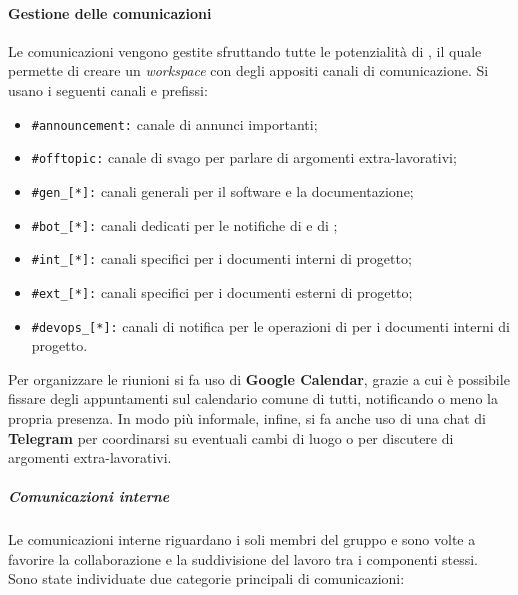 		\paragraph{Gestione delle comunicazioni}

		Le comunicazioni vengono gestite sfruttando tutte le potenzialità di , il quale permette di creare un \textit{workspace} con degli appositi canali di comunicazione. Si usano i seguenti canali e prefissi:
			\begin{itemize}
			  \item \verb!#announcement:! canale di annunci importanti;
			  \item \verb!#offtopic:! canale di svago per parlare di argomenti extra-lavorativi;
			  \item \verb!#gen_[*]:! canali generali per il software e la documentazione;
			  \item \verb!#bot_[*]:! canali dedicati per le notifiche di  e di ;
			  \item \verb!#int_[*]:! canali specifici per i documenti interni di progetto;
			  \item \verb!#ext_[*]:! canali specifici per i documenti esterni di progetto;
			  \item \verb!#devops_[*]:! canali di notifica per le operazioni di  per i documenti interni di progetto.
			\end{itemize}
	
		Per organizzare le riunioni si fa uso di \textbf{Google Calendar}, grazie a cui è possibile fissare degli appuntamenti sul calendario comune di tutti, notificando o meno la propria presenza.
		In modo più informale, infine, si fa anche uso di una chat di \textbf{Telegram} per coordinarsi su eventuali cambi di luogo o per discutere di argomenti extra-lavorativi.

		\subparagraph{Comunicazioni interne}

				Le comunicazioni interne riguardano i soli membri del gruppo e sono volte a favorire la collaborazione e la suddivisione del lavoro tra i componenti stessi.
				\newline
				Sono state individuate due categorie principali di comunicazioni:

